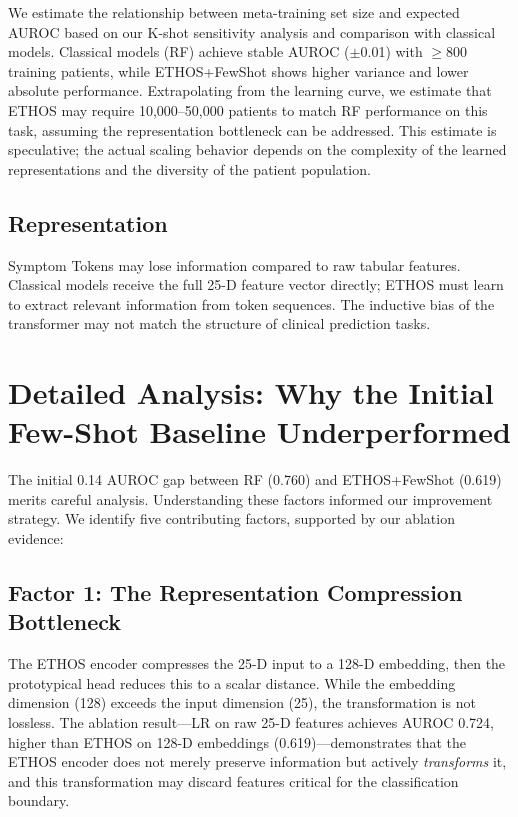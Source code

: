 We estimate the relationship between meta-training set size and expected AUROC based on our K-shot sensitivity analysis and comparison with classical models. Classical models (RF) achieve stable AUROC ($\pm$0.01) with $\geq$800 training patients, while ETHOS+FewShot shows higher variance and lower absolute performance. Extrapolating from the learning curve, we estimate that ETHOS may require 10,000--50,000 patients to match RF performance on this task, assuming the representation bottleneck can be addressed. This estimate is speculative; the actual scaling behavior depends on the complexity of the learned representations and the diversity of the patient population.

\subsection{Representation}

Symptom Tokens may lose information compared to raw tabular features. Classical models receive the full 25-D feature vector directly; ETHOS must learn to extract relevant information from token sequences. The inductive bias of the transformer may not match the structure of clinical prediction tasks.

\section{Detailed Analysis: Why the Initial Few-Shot Baseline Underperformed}

The initial 0.14 AUROC gap between RF (0.760) and ETHOS+FewShot (0.619) merits careful analysis. Understanding these factors informed our improvement strategy. We identify five contributing factors, supported by our ablation evidence:

\subsection{Factor 1: The Representation Compression Bottleneck}

The ETHOS encoder compresses the 25-D input to a 128-D embedding, then the prototypical head reduces this to a scalar distance. While the embedding dimension (128) exceeds the input dimension (25), the transformation is not lossless. The ablation result---LR on raw 25-D features achieves AUROC 0.724, higher than ETHOS on 128-D embeddings (0.619)---demonstrates that the ETHOS encoder does not merely preserve information but actively \emph{transforms} it, and this transformation may discard features critical for the classification boundary.

